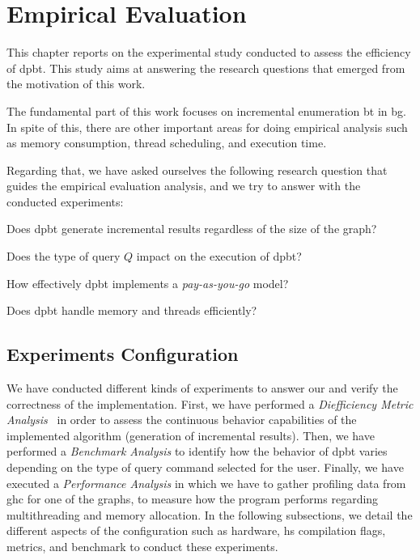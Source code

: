 \chapter{Empirical Evaluation}\label{experiments}
This chapter reports on the experimental study conducted to assess the efficiency of \acrshort{dpbt}. This study aims at answering the research questions that emerged from the motivation of this work. 

The fundamental part of this work focuses on incremental enumeration \acrshort{bt} in \acrshort{bg}. 
In spite of this, there are other important areas for doing empirical analysis such as memory consumption, thread scheduling, and execution time.

Regarding that, we have asked ourselves the following research question that guides the empirical evaluation analysis, and we try to answer with the conducted experiments:
\begin{inparaenum}[\bf {\bf RQ}1\upshape)]
\label{res:bt:question}
    \item Does \acrshort{dpbt} generate incremental results regardless of the size of the graph?
    \item Does the type of query $Q$ impact on the execution of \acrshort{dpbt}?
    \item How effectively \acrshort{dpbt} implements a \emph{pay-as-you-go} model?
    \item Does \acrshort{dpbt} handle memory and threads efficiently?
\end{inparaenum}
  
\section{Experiments Configuration}
We have conducted different kinds of experiments to answer our  and verify the correctness of the implementation.
First, we have performed a \emph{Diefficiency Metric Analysis}~\cite{diefpaper} in order to assess the continuous behavior capabilities of the implemented algorithm (generation of incremental results). 
Then, we have performed a \emph{Benchmark Analysis} to identify how the behavior of \acrshort{dpbt} varies depending on the type of query command selected for the user.
Finally, we have executed a \textit{Performance Analysis} in which we have to gather profiling data from \acrfull{ghc} for one of the graphs, 
to measure how the program performs regarding multithreading and memory allocation.
In the following subsections, we detail the different aspects of the configuration such as hardware, \acrshort{hs} compilation flags, metrics, and benchmark to conduct these experiments.


